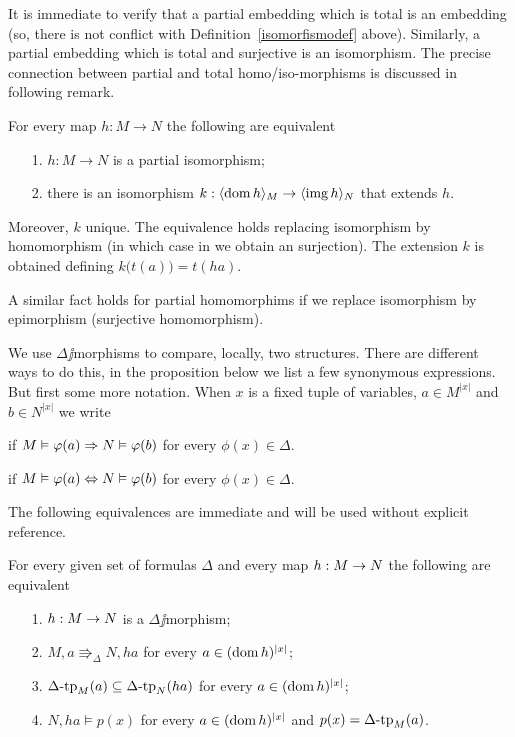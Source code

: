 \documentclass[creche.tex]{subfiles}
\begin{document}
It is immediate to verify that a partial embedding which is total is an embedding (so, there is not conflict with Definition~\ref{isomorfismodef} above).
Similarly, a partial embedding which is total and surjective is an isomorphism.
The precise connection between partial and total homo/iso-morphisms is discussed in following remark.


\begin{remark}\label{rem_extension_homo}
For every map  $h:M\to N$ the following are equivalent
\begin{itemize}
\item[1.] $h:M\to N$ is a partial isomorphism;
\item[2.] there is an isomorphism $k:\langle\mathop{\rm dom} h\rangle_M\to\langle\mathop{\rm img} h\rangle_N$ that extends $h$.
\end{itemize}
Moreover, $k$ unique.
The equivalence holds replacing isomorphism by homomorphism 
(in which case in  we obtain an surjection).
The extension $k$ is obtained defining $k\big(t(a)\big)=t(ha)$.

A similar fact holds for partial homomorphims if we replace isomorphism by epimorphism (surjective homomorphism).\QED
\end{remark}


We use $\Delta\jj$morphisms to compare, locally, two structures.
There are different ways to do this, in the proposition below we list a few synonymous expressions.
But first some more notation.
When $x$ is a fixed tuple of variables, $a\in M^{|x|}$ and $b\in N^{|x|}$ we write

\hfill if $M\vDash\varphi(a)\Rightarrow N\vDash\varphi(b)$ for every $\phi(x)\in\Delta$.

\hfill if $M\vDash\varphi(a)\Leftrightarrow N\vDash\varphi(b)$ for every $\phi(x)\in\Delta$.

The following equivalences are immediate and will be used without explicit reference.

\begin{proposition}\label{oss_Delta-morfismi}
For every given set of formulas $\Delta$ and every map $h:M\rightarrow N$ the following are equivalent
\begin{itemize}
\item[1.] $h:M\rightarrow N$ is a $\Delta\jj$morphism;
\item[2.] $M,a\Rrightarrow_\Delta N,ha$  for every $a\in(\mathop{\rm dom} h)^{|x|}$;
\item[3.] $\Delta\mbox{-}\textrm{tp}_M(a)\subseteq\Delta\mbox{-}\textrm{tp}_N(ha)$ for every $a\in(\mathop{\rm dom} h)^{|x|}$;
\item[4.] $N,ha\models p(x)$ for every $a\in(\mathop{\rm dom} h)^{|x|}$ and $p(x)=\Delta\mbox{-}\textrm{tp}_M(a)$.\QED
\end{itemize}
\end{proposition}
\end{document}

